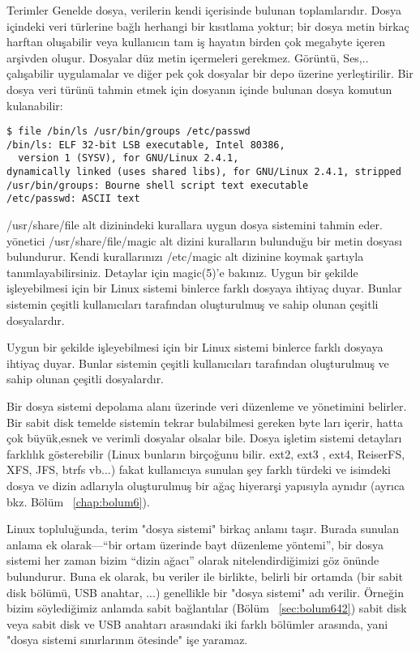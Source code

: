 \begin{section}{Terimler}
Genelde dosya, verilerin kendi içerisinde bulunan toplamlarıdır. Dosya içindeki veri türlerine bağlı herhangi bir kısıtlama yoktur; bir dosya metin birkaç harftan oluşabilir veya kullanıcın tam iş hayatın birden çok megabyte içeren arşivden oluşur. Dosyalar düz metin içermeleri gerekmez. Görüntü, Ses,.. çalışabilir uygulamalar ve diğer pek çok dosyalar bir depo üzerine yerleştirilir. Bir dosya veri türünü tahmin etmek için dosyanın içinde bulunan dosya komutun kulanabilir:

\begin{verbatim}
$ file /bin/ls /usr/bin/groups /etc/passwd
/bin/ls: ELF 32-bit LSB executable, Intel 80386,
  version 1 (SYSV), for GNU/Linux 2.4.1,
dynamically linked (uses shared libs), for GNU/Linux 2.4.1, stripped
/usr/bin/groups: Bourne shell script text executable
/etc/passwd: ASCII text
\end{verbatim}

/usr/share/file alt dizinindeki kurallara uygun dosya sistemini tahmin eder.
yönetici /usr/share/file/magic alt dizini kuralların bulunduğu bir metin dosyası
bulundurur. Kendi kurallarınızı /etc/magic alt dizinine koymak şartıyla
tanımlayabilirsiniz. Detaylar için magic(5)'e bakınız. Uygun bir şekilde işleyebilmesi için bir Linux sistemi binlerce farklı dosyaya ihtiyaç duyar. Bunlar sistemin çeşitli kullanıcıları tarafından oluşturulmuş ve sahip olunan çeşitli
dosyalardır.

Uygun bir şekilde işleyebilmesi için bir Linux sistemi binlerce farklı dosyaya ihtiyaç duyar. Bunlar sistemin çeşitli kullanıcıları tarafından oluşturulmuş ve sahip olunan çeşitli dosyalardır.

Bir dosya sistemi depolama alanı üzerinde veri düzenleme ve yönetimini belirler. Bir sabit disk temelde sistemin tekrar bulabilmesi gereken byte ları içerir, hatta çok büyük,esnek ve verimli dosyalar olsalar bile. Dosya işletim sistemi detayları farklılık gösterebilir (Linux bunların birçoğunu bilir. ext2, ext3 , ext4, ReiserFS, XFS, JFS, btrfs vb...) fakat kullanıcıya sunulan şey farklı türdeki ve isimdeki dosya ve dizin adlarıyla oluşturulmuş bir ağaç hiyerarşi yapısıyla aynıdır (ayrıca bkz. Bölüm ~\ref{chap:bolum6}).

Linux topluluğunda, terim "dosya sistemi" birkaç anlamı taşır. Burada sunulan anlama ek olarak—“bir ortam üzerinde bayt düzenleme yöntemi”, bir dosya sistemi her zaman bizim “dizin ağacı” olarak nitelendirdiğimizi göz önünde bulundurur. Buna ek olarak, bu veriler ile birlikte, belirli bir ortamda (bir sabit disk bölümü, USB anahtar, ...) genellikle bir "dosya sistemi" adı verilir. Örneğin bizim söylediğimiz anlamda sabit bağlantılar (Bölüm ~\ref{sec:bolum642}) sabit disk veya sabit disk ve USB anahtarı arasındaki iki farklı bölümler arasında, yani "dosya sistemi sınırlarının ötesinde" işe yaramaz.
\end{section}
